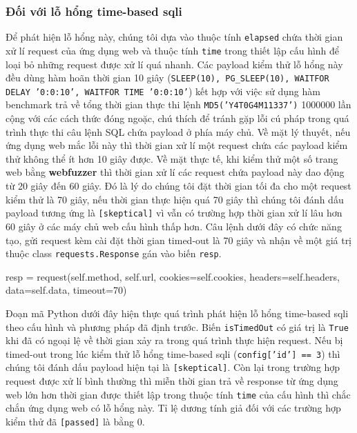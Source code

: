 \subsubsection{Đối với lỗ hổng time-based \acrlong{sqli}}
Để phát hiện lỗ hổng này, chúng tôi dựa vào thuộc tính \texttt{elapsed} chứa thời gian xử lí request của ứng dụng web và thuộc tính \texttt{time} trong thiết lập cấu hình để loại bỏ những request được xử lí quá nhanh. Các payload kiểm thử lỗ hổng này đều dùng hàm hoãn thời gian 10 giây (\texttt{SLEEP(10), PG\_SLEEP(10), WAITFOR DELAY '0:0:10', WAITFOR TIME '0:0:10'}) kết hợp với việc sử dụng hàm benchmark trả về tổng thời gian thực thi lệnh \texttt{MD5('Y4T0G4M11337')} 1000000 lần cộng với các cách thức đóng ngoặc, chú thích để tránh gặp lỗi cú pháp trong quá trình thực thi câu lệnh SQL chứa payload ở phía máy chủ. Về mặt lý thuyết, nếu ứng dụng web mắc lỗi này thì thời gian xử lí một request chứa các payload kiểm thử không thể ít hơn 10 giây được. Về mặt thực tế, khi kiểm thử một số trang web bằng \textbf{webfuzzer} thì thời gian xử lí các request chứa payload này dao động từ 20 giây đến 60 giây. Đó là lý do chúng tôi đặt thời gian tối đa cho một request kiểm thử là 70 giây, nếu thời gian thực hiện quá 70 giây thì chúng tôi đánh dấu payload tương ứng là \texttt{[skeptical]} vì vẫn có trường hợp thời gian xử lí lâu hơn 60 giây ở các máy chủ web cấu hình thấp hơn. Câu lệnh dưới đây có chức năng tạo, gửi request kèm cài đặt thời gian timed-out là 70 giây và nhận về một giá trị thuộc class \texttt{requests.Response} gán vào biến \texttt{resp}.\\
\begin{python}
resp = request(self.method, self.url, cookies=self.cookies, headers=self.headers, data=self.data, timeout=70)
\end{python}
Đoạn mã Python dưới đây hiện thực quá trình phát hiện lỗ hổng time-based \acrshort{sqli} theo cấu hình và phương pháp đã định trước. Biến \texttt{isTimedOut} có giá trị là \texttt{True} khi đã có ngoại lệ về thời gian xảy ra trong quá trình thực hiện request. Nếu bị timed-out trong lúc kiểm thử lỗ hổng time-based \acrshort{sqli} (\texttt{config['id'] == 3}) thì chúng tôi đánh dấu payload hiện tại là \texttt{[skeptical]}. Còn lại trong trường hợp request được xử lí bình thường thì miễn thời gian trả về response từ ứng dụng web lớn hơn thời gian được thiết lập trong thuộc tính \texttt{time} của cấu hình thì chắc chắn ứng dụng web có lỗ hổng này. Tỉ lệ dương tính giả đối với các trường hợp kiểm thử đã \texttt{[passed]} là bằng 0.\\
